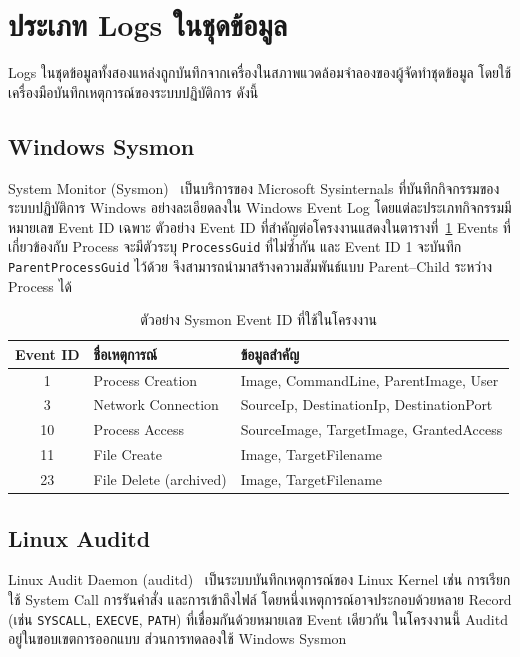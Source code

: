 \section{ประเภท Logs ในชุดข้อมูล}
Logs ในชุดข้อมูลทั้งสองแหล่งถูกบันทึกจากเครื่องในสภาพแวดล้อมจำลองของผู้จัดทำชุดข้อมูล
โดยใช้เครื่องมือบันทึกเหตุการณ์ของระบบปฏิบัติการ ดังนี้

\subsection{Windows Sysmon}
System Monitor (Sysmon)~\cite{sysmon} เป็นบริการของ Microsoft Sysinternals
ที่บันทึกกิจกรรมของระบบปฏิบัติการ Windows อย่างละเอียดลงใน Windows Event Log
โดยแต่ละประเภทกิจกรรมมีหมายเลข Event ID เฉพาะ ตัวอย่าง Event ID ที่สำคัญต่อโครงงานแสดงในตารางที่~\ref{tab:sysmon-eid}
Events ที่เกี่ยวข้องกับ Process จะมีตัวระบุ \texttt{ProcessGuid} ที่ไม่ซ้ำกัน
และ Event ID 1 จะบันทึก \texttt{ParentProcessGuid} ไว้ด้วย
จึงสามารถนำมาสร้างความสัมพันธ์แบบ Parent--Child ระหว่าง Process ได้

\begin{table}[ht]
  \centering
  \caption{ตัวอย่าง Sysmon Event ID ที่ใช้ในโครงงาน}
  \label{tab:sysmon-eid}
  \begin{tabular}{|c|l|l|}
    \hline
    \textbf{Event ID} & \textbf{ชื่อเหตุการณ์} & \textbf{ข้อมูลสำคัญ} \\ \hline
    1  & Process Creation        & Image, CommandLine, ParentImage, User \\ \hline
    3  & Network Connection      & SourceIp, DestinationIp, DestinationPort \\ \hline
    10 & Process Access          & SourceImage, TargetImage, GrantedAccess \\ \hline
    11 & File Create             & Image, TargetFilename \\ \hline
    23 & File Delete (archived)  & Image, TargetFilename \\ \hline
  \end{tabular}
\end{table}

\subsection{Linux Auditd}
Linux Audit Daemon (auditd)~\cite{auditd} เป็นระบบบันทึกเหตุการณ์ของ Linux Kernel
เช่น การเรียกใช้ System Call การรันคำสั่ง และการเข้าถึงไฟล์
โดยหนึ่งเหตุการณ์อาจประกอบด้วยหลาย Record (เช่น \texttt{SYSCALL}, \texttt{EXECVE}, \texttt{PATH})
ที่เชื่อมกันด้วยหมายเลข Event เดียวกัน
ในโครงงานนี้ Auditd อยู่ในขอบเขตการออกแบบ ส่วนการทดลองใช้ Windows Sysmon

